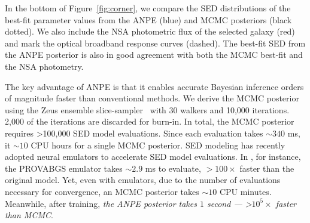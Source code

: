In the bottom of Figure~\ref{fig:corner}, we compare the SED distributions of
the best-fit parameter values from the ANPE (blue) and MCMC posteriors (black
dotted). 
We also include the NSA photometric flux of the selected galaxy (red) and mark
the optical broadband response curves (dashed). 
The best-fit SED from the ANPE posterior is also in good agreement with both
the MCMC best-fit and the NSA photometry.  

The key advantage of ANPE is that it enables accurate Bayesian inference
orders of magnitude faster than conventional methods. 
We derive the MCMC posterior using the {\sc Zeus} ensemble
slice-sampler~\citep{karamanis2020} with 30 walkers and 10,000 iterations.
2,000 of the iterations are discarded for burn-in. 
In total, the MCMC posterior requires >100,000 SED model evaluations. 
Since each evaluation takes ${\sim}340$ ms, it ${\sim}10$ CPU hours for
a single MCMC posterior. 
SED modeling has recently adopted neural emulators to accelerate SED model
evaluations. 
In , for instance, the PROVABGS emulator takes
${\sim}2.9$ ms to evaluate, $>100\times$ faster than the original model. 
Yet, even with emulators, due to the number of evaluations necessary for
convergence, an MCMC posterior takes ${\sim}10$ CPU minutes. 
Meanwhile, after training, \emph{the ANPE posterior takes $1$ second ---
>$10^5\times$ faster than MCMC}. 

